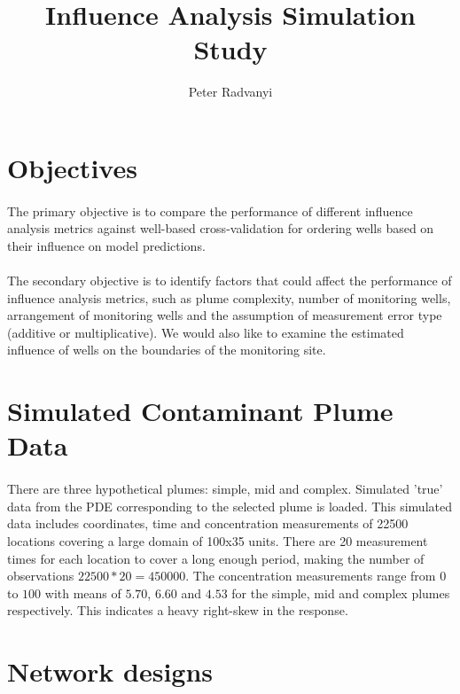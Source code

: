 \documentclass{article}
\title{Influence Analysis Simulation Study}
\author{Peter Radvanyi}
\begin{document}
\maketitle

\section{Objectives}
\paragraph{}

The primary objective is to compare the performance of different influence analysis metrics against well-based cross-validation for ordering wells based on their influence on model predictions. 

\paragraph{}

The secondary objective is to identify factors that could affect the performance of influence analysis metrics, such as plume complexity, number of monitoring wells, arrangement of monitoring wells and the assumption of measurement error type (additive or multiplicative). We would also like to examine the estimated influence of wells on the boundaries of the monitoring site.

\section{Simulated Contaminant Plume Data}
\paragraph{}

There are three hypothetical plumes: simple, mid and complex. Simulated 'true' data from the PDE corresponding to the selected plume is loaded. This simulated data includes coordinates, time and concentration measurements of 22500 locations covering a large domain of 100x35 units. There are 20 measurement times for each location to cover a long enough period, making the number of observations $22500 * 20 = 450000$. The concentration measurements range from $0$ to $100$ with means of $5.70$, $6.60$ and $4.53$ for the simple, mid and complex plumes respectively. This indicates a heavy right-skew in the response.

\section{Network designs}
\end{document}
